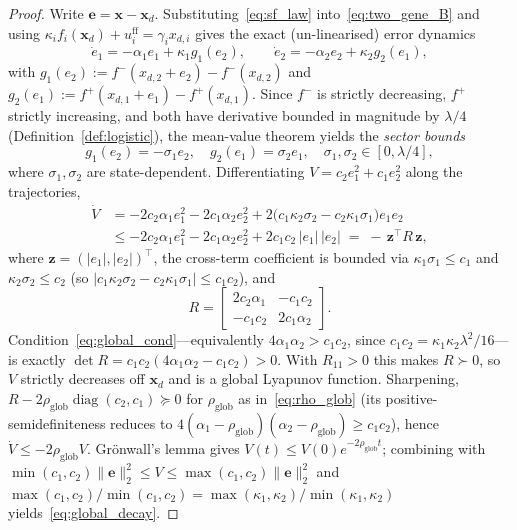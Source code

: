 \documentclass[10pt,a4paper]{amsart}
\begin{document}
\begin{proof}
Write $\mathbf{e}=\mathbf{x}-\mathbf{x}_d$. Substituting~\eqref{eq:sf_law}
into~\eqref{eq:two_gene_B} and using
$\kappa_i f_i(\mathbf{x}_d)+u_i^{\mathrm{ff}}=\gamma_i x_{d,i}$ gives the
exact (un-linearised) error dynamics
\[
\dot e_1 = -\alpha_1 e_1 + \kappa_1 g_1(e_2),\qquad
\dot e_2 = -\alpha_2 e_2 + \kappa_2 g_2(e_1),
\]
with $g_1(e_2):=f^-(x_{d,2}+e_2)-f^-(x_{d,2})$ and
$g_2(e_1):=f^+(x_{d,1}+e_1)-f^+(x_{d,1})$. Since $f^-$ is strictly
decreasing, $f^+$ strictly increasing, and both have derivative bounded
in magnitude by $\lambda/4$ (Definition~\ref{def:logistic}), the
mean-value theorem yields the \emph{sector bounds}
\[
g_1(e_2)=-\sigma_1 e_2,\quad g_2(e_1)=\sigma_2 e_1,\quad
\sigma_1,\sigma_2\in[0,\lambda/4],
\]
where $\sigma_1,\sigma_2$ are state-dependent. Differentiating
$V=c_2 e_1^2+c_1 e_2^2$ along the trajectories,
\begin{align*}
\dot V &= -2c_2\alpha_1 e_1^2 - 2c_1\alpha_2 e_2^2
        + 2\bigl(c_1\kappa_2\sigma_2 - c_2\kappa_1\sigma_1\bigr)e_1 e_2\\
       &\le -2c_2\alpha_1 e_1^2 - 2c_1\alpha_2 e_2^2 + 2c_1c_2\,|e_1|\,|e_2|
        \;=\; -\,\mathbf{z}^{\!\top} R\,\mathbf{z},
\end{align*}
where $\mathbf{z}=(|e_1|,|e_2|)^{\!\top}$, the cross-term coefficient is
bounded via $\kappa_1\sigma_1\le c_1$ and $\kappa_2\sigma_2\le c_2$ (so
$|c_1\kappa_2\sigma_2-c_2\kappa_1\sigma_1|\le c_1c_2$), and
\[
R=\begin{bmatrix} 2c_2\alpha_1 & -c_1c_2\\[2pt] -c_1c_2 & 2c_1\alpha_2\end{bmatrix}.
\]
Condition~\eqref{eq:global_cond}---equivalently $4\alpha_1\alpha_2>c_1c_2$,
since $c_1c_2=\kappa_1\kappa_2\lambda^2/16$---is exactly
$\det R=c_1c_2(4\alpha_1\alpha_2-c_1c_2)>0$. With $R_{11}>0$ this makes
$R\succ0$, so $V$ strictly decreases off $\mathbf{x}_d$ and is a global
Lyapunov function. Sharpening, $R-2\rho_{\mathrm{glob}}\operatorname{diag}(c_2,c_1)
\succeq0$ for $\rho_{\mathrm{glob}}$ as in~\eqref{eq:rho_glob} (its
positive-semidefiniteness reduces to
$4(\alpha_1-\rho_{\mathrm{glob}})(\alpha_2-\rho_{\mathrm{glob}})\ge c_1c_2$),
hence $\dot V\le-2\rho_{\mathrm{glob}}V$. Gr\"onwall's lemma gives
$V(t)\le V(0)e^{-2\rho_{\mathrm{glob}}t}$; combining with
$\min(c_1,c_2)\|\mathbf{e}\|_2^2\le V\le\max(c_1,c_2)\|\mathbf{e}\|_2^2$
and $\max(c_1,c_2)/\min(c_1,c_2)=\max(\kappa_1,\kappa_2)/\min(\kappa_1,\kappa_2)$
yields~\eqref{eq:global_decay}.
\end{proof}
\end{document}
